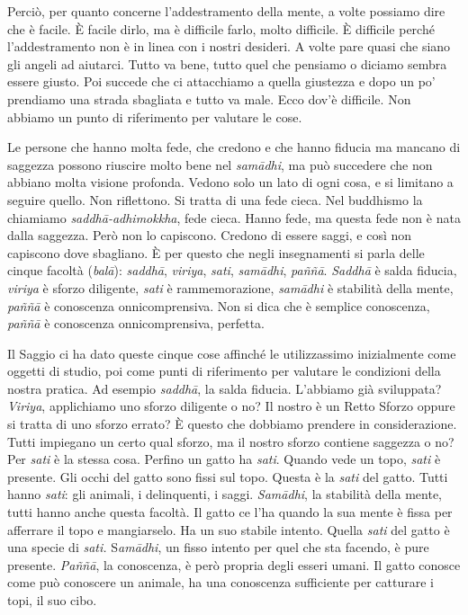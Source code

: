 Perciò, per quanto concerne l'addestramento della mente, a volte
possiamo dire che è facile. È facile dirlo, ma è difficile farlo, molto
difficile. È difficile perché l'addestramento non è in linea con i
nostri desideri. A volte pare quasi che siano gli angeli ad aiutarci.
Tutto va bene, tutto quel che pensiamo o diciamo sembra essere giusto.
Poi succede che ci attacchiamo a quella giustezza e dopo un po'
prendiamo una strada sbagliata e tutto va male. Ecco dov'è difficile.
Non abbiamo un punto di riferimento per valutare le cose.

Le persone che hanno molta fede, che credono e che hanno fiducia ma
mancano di saggezza possono riuscire molto bene nel \emph{samādhi}, ma
può succedere che non abbiano molta visione profonda. Vedono solo un
lato di ogni cosa, e si limitano a seguire quello. Non riflettono. Si
tratta di una fede cieca. Nel buddhismo la chiamiamo
\emph{saddhā-adhimokkha}, fede cieca. Hanno fede, ma questa fede non è
nata dalla saggezza. Però non lo capiscono. Credono di essere saggi, e
così non capiscono dove sbagliano. È per questo che negli insegnamenti
si parla delle cinque facoltà (\emph{balā}):
\emph{saddhā}, \emph{viriya}, \emph{sati}, \emph{samādhi}, \emph{paññā}.
\emph{Saddhā} è salda fiducia, \emph{viriya} è sforzo diligente,
\emph{sati} è rammemorazione, \emph{samādhi} è stabilità della mente,
\emph{paññā} è conoscenza onnicomprensiva. Non si dica che è semplice
conoscenza, \emph{paññā} è conoscenza onnicomprensiva, perfetta.

Il Saggio ci ha dato queste cinque cose affinché le utilizzassimo
inizialmente come oggetti di studio, poi come punti di riferimento per
valutare le condizioni della nostra pratica. Ad esempio \emph{saddhā},
la salda fiducia. L'abbiamo già sviluppata? \emph{Viriya}, applichiamo
uno sforzo diligente o no? Il nostro è un Retto Sforzo oppure si tratta
di uno sforzo errato? È questo che dobbiamo prendere in considerazione.
Tutti impiegano un certo qual sforzo, ma il nostro sforzo contiene
saggezza o no? Per \emph{sati} è la stessa cosa. Perfino un gatto ha
\emph{sati}. Quando vede un topo, \emph{sati} è presente. Gli occhi del
gatto sono fissi sul topo. Questa è la \emph{sati} del gatto. Tutti
hanno \emph{sati}: gli animali, i delinquenti, i saggi. \emph{Samādhi},
la stabilità della mente, tutti hanno anche questa facoltà. Il gatto ce
l'ha quando la sua mente è fissa per afferrare il topo e mangiarselo. Ha
un suo stabile intento. Quella \emph{sati} del gatto è una specie di
\emph{sati.} S\emph{amādhi}, un fisso intento per quel che sta facendo,
è pure presente. \emph{Paññā}, la conoscenza, è però propria degli
esseri umani. Il gatto conosce come può conoscere un animale, ha una
conoscenza sufficiente per catturare i topi, il suo cibo.

